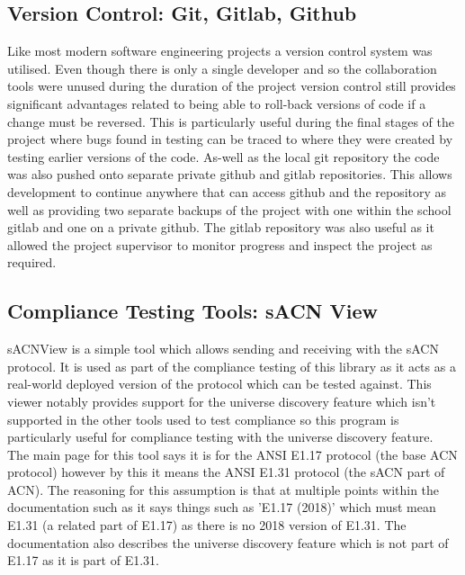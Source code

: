 \documentclass[11pt,a4paper]{report}
\begin{document}
\subsection{Version Control: Git, Gitlab, Github}
Like most modern software engineering projects a version control system was utilised. Even though there is only a single developer and so the collaboration tools were unused during the duration of the project version control still provides significant advantages related to being able to roll-back versions of code if a change must be reversed. This is particularly useful during the final stages of the project where bugs found in testing can be traced to where they were created by testing earlier versions of the code. As-well as the local git repository the code was also pushed onto separate private github and gitlab repositories. This allows development to continue anywhere that can access github and the repository as well as providing two separate backups of the project with one within the school gitlab and one on a private github. The gitlab repository was also useful as it allowed the project supervisor to monitor progress and inspect the project as required.

\subsection{Compliance Testing Tools: sACN View}
sACNView \cite{SACN_VIEW} is a simple tool which allows sending and receiving with the sACN protocol. It is used as part of the compliance testing of this library as it acts as a real-world deployed version of the protocol which can be tested against. This viewer notably provides support for the universe discovery feature which isn't supported in the other tools used to test compliance so this program is particularly useful for compliance testing with the universe discovery feature.\\

The main page for this tool says it is for the ANSI E1.17 \cite{ANSI_E1.17} protocol (the base ACN protocol) however by this it means the ANSI E1.31 protocol (the sACN part of ACN). The reasoning for this assumption is that at multiple points within the documentation such as \cite{SACN_VIEWER_DOC} it says things such as 'E1.17 (2018)' which must mean E1.31 (a related part of E1.17) as there is no 2018 version of E1.31. The documentation also describes the universe discovery feature which is not part of E1.17 as it is part of E1.31.
\end{document}
